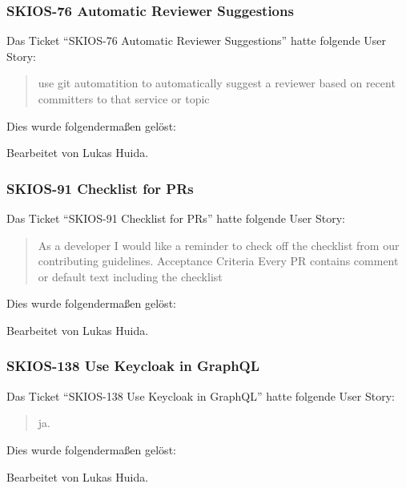 \subsubsection{SKIOS-76 Automatic Reviewer Suggestions}
Das Ticket \enquote{SKIOS-76 Automatic Reviewer Suggestions} hatte folgende User Story:
\begin{quotation}
    use git automatition to automatically suggest a reviewer based on recent committers to that service or topic
\end{quotation}
Dies wurde folgendermaßen gelöst:
\begin{quotation}
    
\end{quotation}
Bearbeitet von Lukas Huida.

\subsubsection{SKIOS-91 Checklist for PRs}
Das Ticket \enquote{SKIOS-91 Checklist for PRs} hatte folgende User Story:
\begin{quotation}
    As a developer I would like a reminder to check off the checklist from our contributing guidelines.
    Acceptance Criteria
    Every PR contains comment or default text including the checklist
\end{quotation}
Dies wurde folgendermaßen gelöst:
\begin{quotation}
    
\end{quotation}
Bearbeitet von Lukas Huida.

\subsubsection{SKIOS-138 Use Keycloak in GraphQL}
Das Ticket \enquote{SKIOS-138 Use Keycloak in GraphQL} hatte folgende User Story:
\begin{quotation}
    ja.
\end{quotation}
Dies wurde folgendermaßen gelöst:
\begin{quotation}
    
\end{quotation}
Bearbeitet von Lukas Huida.
